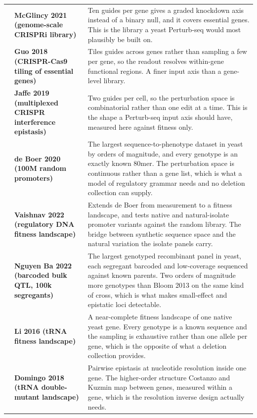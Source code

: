 \begin{longtable}{@{}r@{\hspace{4pt}} L{46mm} L{112mm}@{}}
 & \textbf{McGlincy 2021 (genome-scale CRISPRi library)} & Ten guides per gene gives a graded knockdown axis instead of a binary null, and it covers essential genes. This is the library a yeast Perturb-seq would most plausibly be built on. \\
 & \textbf{Guo 2018 (CRISPR-Cas9 tiling of essential genes)} & Tiles guides across genes rather than sampling a few per gene, so the readout resolves within-gene functional regions. A finer input axis than a gene-level library. \\
 & \textbf{Jaffe 2019 (multiplexed CRISPR interference epistasis)} & Two guides per cell, so the perturbation space is combinatorial rather than one edit at a time. This is the shape a Perturb-seq input axis should have, measured here against fitness only. \\
 & \textbf{de Boer 2020 (100M random promoters)} & The largest sequence-to-phenotype dataset in yeast by orders of magnitude, and every genotype is an exactly known 80mer. The perturbation space is continuous rather than a gene list, which is what a model of regulatory grammar needs and no deletion collection can supply. \\
 & \textbf{Vaishnav 2022 (regulatory DNA fitness landscape)} & Extends de Boer from measurement to a fitness landscape, and tests native and natural-isolate promoter variants against the random library. The bridge between synthetic sequence space and the natural variation the isolate panels carry. \\
 & \textbf{Nguyen Ba 2022 (barcoded bulk QTL, 100k segregants)} & The largest genotyped recombinant panel in yeast, each segregant barcoded and low-coverage sequenced against known parents. Two orders of magnitude more genotypes than Bloom 2013 on the same kind of cross, which is what makes small-effect and epistatic loci detectable. \\
 & \textbf{Li 2016 (tRNA fitness landscape)} & A near-complete fitness landscape of one native yeast gene. Every genotype is a known sequence and the sampling is exhaustive rather than one allele per gene, which is the opposite of what a deletion collection provides. \\
 & \textbf{Domingo 2018 (tRNA double-mutant landscape)} & Pairwise epistasis at nucleotide resolution inside one gene. The higher-order structure Costanzo and Kuzmin map between genes, measured within a gene, which is the resolution inverse design actually needs. \\

\end{longtable}
